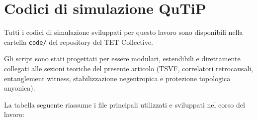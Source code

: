 \documentclass[11pt,a4paper]{article}
\theoremstyle{plain}
\theoremstyle{definition}
\begin{document}
\appendix
\section{Codici di simulazione QuTiP}

\vspace{0.2cm}

Tutti i codici di simulazione sviluppati per questo lavoro sono disponibili nella cartella \texttt{code/} del repository del TET Collective. 

\vspace{0.5cm}


Gli script sono stati progettati per essere modulari, estendibili e direttamente collegati alle sezioni teoriche del presente articolo (TSVF, correlatori retrocausali, entanglement witness, stabilizzazione negentropica e protezione topologica anyonica).

\vspace{0.4cm}

La tabella seguente riassume i file principali utilizzati e sviluppati nel corso del lavoro:

\vspace{0.4cm}
\end{document}
